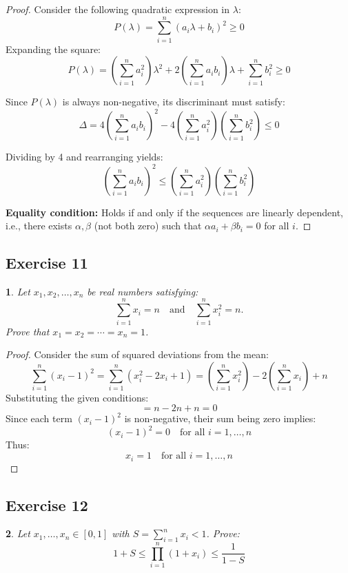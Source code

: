 \documentclass[12pt]{article}
\newtheorem{problem}{}
\begin{document}
\begin{proof}
Consider the following quadratic expression in \( \lambda \):
\[
P(\lambda) = \sum_{i=1}^n (a_i \lambda + b_i)^2 \geq 0
\]
Expanding the square:
\[
P(\lambda) = \left( \sum_{i=1}^n a_i^2 \right) \lambda^2 + 2 \left( \sum_{i=1}^n a_i b_i \right) \lambda + \sum_{i=1}^n b_i^2 \geq 0
\]

Since \( P(\lambda) \) is always non-negative, its discriminant must satisfy:
\[
\Delta = 4\left( \sum_{i=1}^n a_i b_i \right)^2 - 4 \left( \sum_{i=1}^n a_i^2 \right) \left( \sum_{i=1}^n b_i^2 \right) \leq 0
\]

Dividing by 4 and rearranging yields:
\[
\left( \sum_{i=1}^n a_i b_i \right)^2 \leq \left( \sum_{i=1}^n a_i^2 \right) \left( \sum_{i=1}^n b_i^2 \right)
\]

\textbf{Equality condition:} Holds if and only if the sequences are linearly dependent, i.e., there exists \( \alpha, \beta \) (not both zero) such that \( \alpha a_i + \beta b_i = 0 \) for all \( i \).
\end{proof}

\subsection*{Exercise 11}
\begin{problem}
Let \( x_1, x_2, \ldots, x_n \) be real numbers satisfying:
\[
\sum_{i=1}^n x_i = n \quad \text{and} \quad \sum_{i=1}^n x_i^2 = n.
\]
Prove that \( x_1 = x_2 = \cdots = x_n = 1 \).
\end{problem}

\begin{proof}
Consider the sum of squared deviations from the mean:
\[
\sum_{i=1}^n (x_i - 1)^2 = \sum_{i=1}^n (x_i^2 - 2x_i + 1) = \left(\sum_{i=1}^n x_i^2\right) - 2\left(\sum_{i=1}^n x_i\right) + n
\]
Substituting the given conditions:
\[
= n - 2n + n = 0
\]
Since each term \( (x_i - 1)^2 \) is non-negative, their sum being zero implies:
\[
(x_i - 1)^2 = 0 \quad \text{for all } i = 1, \ldots, n
\]
Thus:
\[
x_i = 1 \quad \text{for all } i = 1, \ldots, n
\]
\end{proof}


\subsection*{Exercise 12}
\begin{problem}
Let \( x_1, \ldots, x_n \in [0,1] \) with \( S = \sum_{i=1}^n x_i < 1 \). Prove:
\[
1 + S \leq \prod_{i=1}^n (1 + x_i) \leq \frac{1}{1 - S}
\]
\end{problem}
\end{document}
